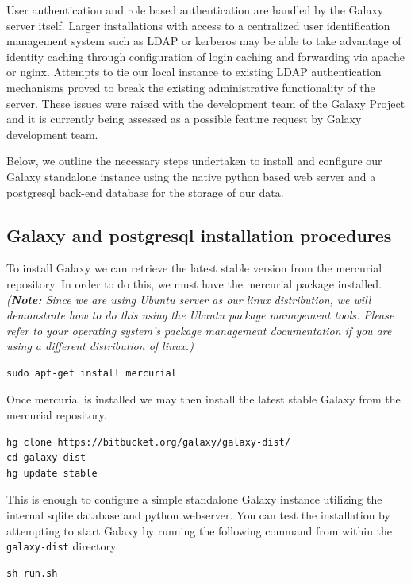 \documentclass[a4paper,10pt]{article}
\begin{document}
User authentication and role based authentication are handled by the Galaxy server itself.  Larger installations with access to a centralized user identification management system such as LDAP or kerberos may be able to take advantage of identity caching through configuration of login caching and forwarding via apache or nginx.  Attempts to tie our local instance to existing LDAP authentication mechanisms proved to break the existing administrative functionality of the server.  These issues were raised with the development team of the Galaxy Project and it is currently being assessed as a possible feature request by Galaxy development team.

Below, we outline the necessary steps undertaken to install and configure our Galaxy standalone instance using the native python based web server and a postgresql back-end database for the storage of our data.
\subsection{Galaxy and postgresql installation procedures}
To install Galaxy we can retrieve the latest stable version from the mercurial repository.  In order to do this, we must have the mercurial package installed.  \textit{(\textbf{Note:} Since we are using Ubuntu server as our linux distribution, we will demonstrate how to do this using the Ubuntu package management tools.  Please refer to your operating system's package management documentation if you are using a different distribution of linux.)}

\begin{lstlisting}
sudo apt-get install mercurial
\end{lstlisting}

Once mercurial is installed we may then install the latest stable Galaxy from the mercurial repository.

\begin{lstlisting}
hg clone https://bitbucket.org/galaxy/galaxy-dist/
cd galaxy-dist
hg update stable
\end{lstlisting}

This is enough to configure a simple standalone Galaxy instance utilizing the internal sqlite database and python webserver.  You can test the installation by attempting to start Galaxy by running the following command from within the \texttt{\footnotesize{galaxy-dist}} directory.

\begin{lstlisting}
sh run.sh
\end{lstlisting}
\end{document}
